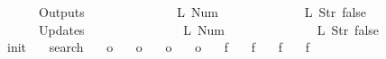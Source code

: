 \begin{isabellebody}
\ \ \ \ \ \ Outputs\ {\isacharequal}\ {\isacharbrackleft}\isanewline
\ \ \ \ \ \ \ \ \ \ \ \ {\isacharparenleft}L\ {\isacharparenleft}Num\ {}{\isacharparenright}{\isacharparenright}{\isacharcomma}\isanewline
\ \ \ \ \ \ \ \ \ \ \ \ {\isacharparenleft}L\ {\isacharparenleft}Str\ {\isacharprime}{\isacharprime}false{\isacharprime}{\isacharprime}{\isacharparenright}{\isacharparenright}\isanewline
\ \ \ \ \ \ {\isacharbrackright}{\isacharcomma}\isanewline
\ \ \ \ \ \ Updates\ {\isacharequal}\ {\isacharbrackleft}\isanewline
\ \ \ \ \ \ \ \ \ \ \ \ {\isacharparenleft}{}{\isacharcomma}\ {\isacharparenleft}L\ {\isacharparenleft}Num\ {}{\isacharparenright}{\isacharparenright}{\isacharparenright}{\isacharcomma}\isanewline
\ \ \ \ \ \ \ \ \ \ \ \ {\isacharparenleft}{}{\isacharcomma}\ {\isacharparenleft}L\ {\isacharparenleft}Str\ {\isacharprime}{\isacharprime}false{\isacharprime}{\isacharprime}{\isacharparenright}{\isacharparenright}{\isacharparenright}\isanewline
\ \ \ \ \ \ {\isacharbrackright}\isanewline
{\isasymrparr}{\isachardoublequoteclose}\isanewline
\isanewline
{}\isamarkupfalse%
\ {\isachardoublequoteopen}init\ {\isasymequiv}\ {}{\isachardoublequoteclose}\isanewline
{}\isamarkupfalse%
\ {\isachardoublequoteopen}search\ {\isasymequiv}\ {}{\isachardoublequoteclose}\isanewline
\isanewline
{}\isamarkupfalse%
\ {\isachardoublequoteopen}o{}\ {\isasymequiv}\ {}{\isachardoublequoteclose}\isanewline
{}\isamarkupfalse%
\ {\isachardoublequoteopen}o{}\ {\isasymequiv}\ {}{\isachardoublequoteclose}\isanewline
{}\isamarkupfalse%
\ {\isachardoublequoteopen}o{}\ {\isasymequiv}\ {}{\isachardoublequoteclose}\isanewline
{}\isamarkupfalse%
\ {\isachardoublequoteopen}o{}\ {\isasymequiv}\ {}{\isachardoublequoteclose}\isanewline
\isanewline
{}\isamarkupfalse%
\ {\isachardoublequoteopen}f{}\ {\isasymequiv}\ {}{\isachardoublequoteclose}\isanewline
{}\isamarkupfalse%
\ {\isachardoublequoteopen}f{}\ {\isasymequiv}\ {}{\isachardoublequoteclose}\isanewline
{}\isamarkupfalse%
\ {\isachardoublequoteopen}f{}\ {\isasymequiv}\ {}{\isachardoublequoteclose}\isanewline
{}\isamarkupfalse%
\ {\isachardoublequoteopen}f{}\ {\isasymequiv}\ {}{\isachardoublequoteclose}\isanewline

\end{isabellebody}
